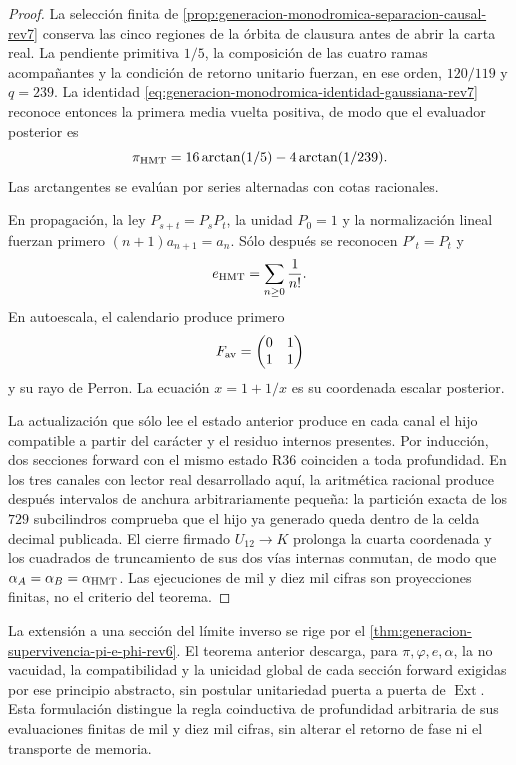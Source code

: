 \begin{proof}
La selección finita de
\cref{prop:generacion-monodromica-separacion-causal-rev7} conserva las cinco
regiones de la órbita de clausura antes de abrir la carta real. La pendiente
primitiva \(1/5\), la composición de las cuatro ramas acompañantes y la
condición de retorno unitario fuerzan, en ese orden, \(120/119\) y \(q=239\).
La identidad
\eqref{eq:generacion-monodromica-identidad-gaussiana-rev7} reconoce entonces
la primera media vuelta positiva, de modo que el evaluador posterior es
\[
 \pi_{\rm HMT}
 =16\arctan(1/5)-4\arctan(1/239).
\]
Las arctangentes se evalúan por series alternadas con cotas racionales.

En propagación, la ley \(P_{s+t}=P_sP_t\), la unidad \(P_0=1\) y la
normalización lineal fuerzan primero \((n+1)a_{n+1}=a_n\). Sólo después se
reconocen \(P'_t=P_t\) y
\[
 e_{\rm HMT}=\sum_{n\ge0}\frac1{n!}.
\]
En autoescala, el calendario produce primero
\[
 F_{\rm av}=\begin{pmatrix}0&1\\1&1\end{pmatrix}
\]
y su rayo de Perron. La ecuación \(x=1+1/x\) es su coordenada escalar
posterior.

La actualización que sólo lee el estado anterior produce en cada canal el
hijo compatible a partir del carácter y el residuo internos presentes. Por
inducción, dos secciones forward con el mismo estado R36 coinciden a toda
profundidad. En los tres canales con lector real desarrollado aquí, la
aritmética racional produce después intervalos de anchura arbitrariamente
pequeña: la partición exacta de los \(729\) subcilindros comprueba que el hijo
ya generado queda dentro de la celda decimal publicada. El cierre firmado
\(U_{12}\to K\) prolonga la cuarta coordenada y los cuadrados de truncamiento
de sus dos vías internas conmutan, de modo que
\(\alpha_A=\alpha_B=\alpha_{\rm HMT}\). Las ejecuciones de mil y diez mil
cifras son proyecciones finitas, no el criterio del teorema.
\end{proof}

La extensión a una sección del límite inverso se rige por el
\cref{thm:generacion-supervivencia-pi-e-phi-rev6}. El teorema anterior
descarga, para \(\pi,\varphi,e,\alpha\), la no vacuidad, la compatibilidad y
la unicidad global de cada sección forward exigidas por ese principio
abstracto, sin postular unitariedad puerta a puerta de
\(\operatorname{Ext}\). Esta formulación distingue la regla coinductiva de
profundidad arbitraria de sus evaluaciones finitas de mil y diez mil cifras,
sin alterar el retorno de fase ni el transporte de memoria.

